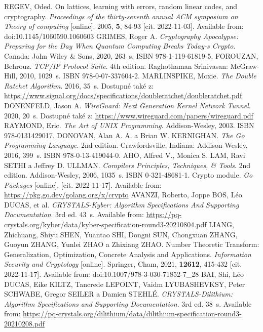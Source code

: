 \begin{thebibliography}{99}
  REGEV, Oded. On lattices, learning with errors, random linear codes, and cryptography. \textit{Proceedings of the thirty-seventh annual ACM symposium on Theory of computing} [online]. 2005, \textbf{5}, 84-93 [cit. 2022-11-03]. Available from: doi:10.1145/1060590.1060603
  GRIMES, Roger A. \textit{Cryptography Apocalypse: Preparing for the Day When Quantum Computing Breaks Today-s Crypto}. Canada: John Wiley \& Sons, 2020, 263~s. ISBN 978-1-119-61819-5.
  FOROUZAN, Behrouz. \textit{TCP/IP Protocol Suite}. 4th edition. Raghothaman Srinivasan: McGraw-Hill, 2010, 1029~s. ISBN 978-0-07-337604-2.
  MARLINSPIKE, Moxie. \textit{The Double Ratchet Algorithm}. 2016, 35~s. Dostupné také z: \url{https://www.signal.org/docs/specifications/doubleratchet/doubleratchet.pdf}
  DONENFELD, Jason A. \textit{WireGuard: Next Generation Kernel Network Tunnel}. 2020, 20~s. Dostupné také z: \url{https://www.wireguard.com/papers/wireguard.pdf}
  RAYMOND, Eric. \textit{The Art of UNIX Programming}. Addison-Wesley, 2003. ISBN 978-0131429017.
  DONOVAN, Alan A. A. a Brian W. KERNIGHAN. \textit{The Go Programming Language}. 2nd edition. Crawfordsville, Indiana: Addison-Wesley, 2016, 399~s. ISBN 978-0-13-419044-0.
  AHO, Alfred V., Monica S. LAM, Ravi SETHI a Jeffrey D. ULLMAN. \textit{Compilers Principles, Techniques, \& Tools}. 2nd edition. Addison-Wesley, 2006, 1035~s. ISBN 0-321-48681-1.
  Crypto module. \textit{Go Packages} [online]. [cit. 2022-11-17]. Available from: \url{https://pkg.go.dev/golang.org/x/crypto}
  AVANZI, Roberto, Joppe BOS, Léo DUCAS, et al. \textit{CRYSTALS-Kyber: Algorithm Specifications And Supporting Documentation}. 3rd ed. 43~s. Available from: \url{https://pq-crystals.org/kyber/data/kyber-specification-round3-20210804.pdf}
  LIANG, Zhichuang, Shiyu SHEN, Yuantao SHI, Dongni SUN, Chongxuan ZHANG, Guoyun ZHANG, Yunlei ZHAO a Zhixiang ZHAO. Number Theoretic Transform: Generalization, Optimization, Concrete Analysis and Applications. \textit{Information Security and Cryptology} [online]. Springer, Cham, 2021, \textbf{12612}, 415-432 [cit. 2022-11-17]. Available from: doi:10.1007/978-3-030-71852-7\_28
  BAI, Shi, Léo DUCAS, Eike KILTZ, Tancrede LEPOINT, Vaidm LYUBASHEVKSY, Peter SCHWABE, Gregor SEILER a Damien STEHLÉ. \textit{CRYSTALS-Dilithium: Algorithm Specifications and Supporting Documentation}. 3rd ed. 38~s. Available from: \url{https://pq-crystals.org/dilithium/data/dilithium-specification-round3-20210208.pdf}


\end{thebibliography}

